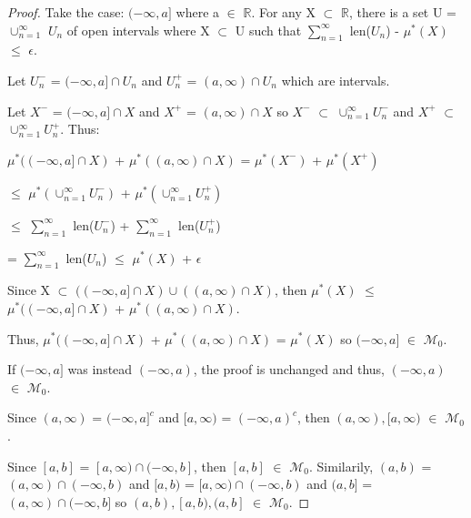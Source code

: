    \begin{proof}
        Take the case: $(-\infty,a]$ where a $\in$ $\mathbb{R}$.
        For any X $\subset$ $\mathbb{R}$, there is a set
        U = $\cup_{n=1}^{\infty}$ $U_n$ of open intervals where X $\subset$ U
        such that
        $\sum_{n=1}^{\infty}$ len($U_n$) - $\mu^*(X)$ $\leq$ $\epsilon$.

        Let $U_n^-$ = $(-\infty,a] \cap U_n$
        and $U_n^+$ = $(a,\infty) \cap U_n$ which are intervals.

        Let $X^-$ = $(-\infty,a] \cap X$ and $X^+$ = $(a,\infty) \cap X$
        so $X^-$ $\subset$ $\cup_{n=1}^{\infty} U_n^-$
        and $X^+$ $\subset$ $\cup_{n=1}^{\infty} U_n^+$. Thus:

        \hspace{0.5cm}
        $\mu^*((-\infty,a] \cap X)$
            + $\mu^*((a,\infty) \cap X)$
        = $\mu^*(X^-)$ + $\mu^*(X^+)$

        \hspace{7cm}
        $\leq$ $\mu^*(\cup_{n=1}^{\infty} U_n^-)$
                + $\mu^*(\cup_{n=1}^{\infty} U_n^+)$

        \hspace{7cm}
        $\leq$ $\sum_{n=1}^{\infty}$ len($U_n^-$)
                + $\sum_{n=1}^{\infty}$ len($U_n^+$)
                
        \hspace{7cm}
        = $\sum_{n=1}^{\infty}$ len($U_n$)
        $\leq$ $\mu^*(X)$ + $\epsilon$

        Since X $\subset$ $((-\infty,a] \cap X) \cup ((a,\infty) \cap X)$, then
        $\mu^*(X)$
        $\leq$ $\mu^*((-\infty,a] \cap X)$ + $\mu^*((a,\infty) \cap X)$.
        
        Thus, $\mu^*((-\infty,a] \cap X)$ + $\mu^*((a,\infty) \cap X)$
        = $\mu^*(X)$ so $(-\infty,a]$ $\in$ $\mathcal{M}_0$.

        If $(-\infty,a]$ was instead $(-\infty,a)$, the proof is unchanged
        and thus, $(-\infty,a)$ $\in$ $\mathcal{M}_0$.

        Since $(a,\infty)$ = $(-\infty,a]^c$ and $[a,\infty)$ = $(-\infty,a)^c$,
        then $(a,\infty),[a,\infty)$ $\in$ $\mathcal{M}_0$.

        Since $[a,b]$ = $[a,\infty) \cap (-\infty,b]$, then
        $[a,b]$ $\in$ $\mathcal{M}_0$.
        Similarily, $(a,b)$ = $(a,\infty) \cap (-\infty,b)$
        and $[a,b)$ = $[a,\infty) \cap (-\infty,b)$
        and $(a,b]$ = $(a,\infty) \cap (-\infty,b]$
        so $(a,b),[a,b),(a,b]$ $\in$ $\mathcal{M}_0$.
    \end{proof}

